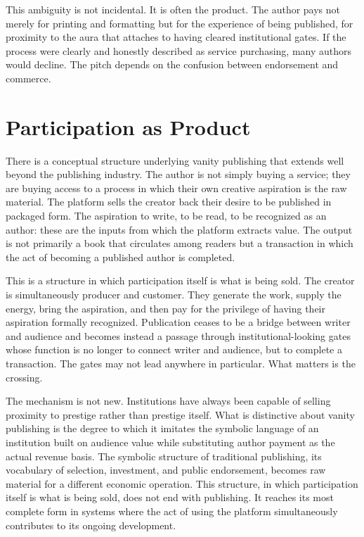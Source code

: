 \documentclass[12pt, a4paper]{article}
\begin{document}
This ambiguity is not incidental. It is often the product. The author pays not merely for printing and formatting but for the experience of being published, for proximity to the aura that attaches to having cleared institutional gates. If the process were clearly and honestly described as service purchasing, many authors would decline. The pitch depends on the confusion between endorsement and commerce.

\section{Participation as Product}

There is a conceptual structure underlying vanity publishing that extends well beyond the publishing industry. The author is not simply buying a service; they are buying access to a process in which their own creative aspiration is the raw material. The platform sells the creator back their desire to be published in packaged form. The aspiration to write, to be read, to be recognized as an author: these are the inputs from which the platform extracts value. The output is not primarily a book that circulates among readers but a transaction in which the act of becoming a published author is completed.

This is a structure in which participation itself is what is being sold. The creator is simultaneously producer and customer. They generate the work, supply the energy, bring the aspiration, and then pay for the privilege of having their aspiration formally recognized. Publication ceases to be a bridge between writer and audience and becomes instead a passage through institutional-looking gates whose function is no longer to connect writer and audience, but to complete a transaction. The gates may not lead anywhere in particular. What matters is the crossing.

The mechanism is not new. Institutions have always been capable of selling proximity to prestige rather than prestige itself. What is distinctive about vanity publishing is the degree to which it imitates the symbolic language of an institution built on audience value while substituting author payment as the actual revenue basis. The symbolic structure of traditional publishing, its vocabulary of selection, investment, and public endorsement, becomes raw material for a different economic operation. This structure, in which participation itself is what is being sold, does not end with publishing. It reaches its most complete form in systems where the act of using the platform simultaneously contributes to its ongoing development.
\end{document}
